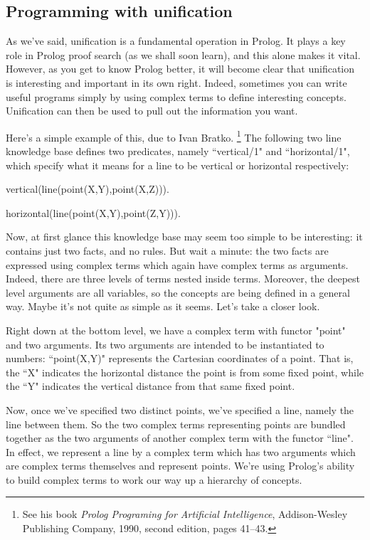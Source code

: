 \subsection*{Programming with unification}\label{SUBSEC.L2.PROGRAMMING-WITH-UNIFICATION}

As we've said, unification is a fundamental operation in Prolog.  It
plays a key role in Prolog proof search (as we shall soon learn), and
this alone makes it vital. However, as you get to know Prolog better,
it will become clear that unification is interesting and important in its
own right. Indeed, sometimes you can write useful programs simply by
using complex terms to define interesting concepts. Unification can then
be used to pull out the information you want.

Here's a simple example of this, due to Ivan Bratko.%
\footnote{See his book
\textit{Prolog Programing for Artificial Intelligence},
Addison-Wesley Publishing Company, 1990, second edition, pages
41--43.}
The following two line knowledge base defines two
predicates, namely ``vertical/1" and ``horizontal/1", which specify what
it means for a line to be vertical or horizontal respectively:
%
\begin{LPNcodedisplay}
vertical(line(point(X,Y),point(X,Z))).

horizontal(line(point(X,Y),point(Z,Y))).
\end{LPNcodedisplay}


Now, at first glance this knowledge base may seem too simple to be
interesting: it contains just two facts, and no rules.  But wait a
minute: the two facts are expressed using complex terms which again
have complex terms as arguments. Indeed, there are three levels of
terms nested inside terms. Moreover, the deepest level arguments are
all variables, so the concepts are being defined in a general way.
Maybe it's not quite as simple as it seems.  Let's take a closer look.

Right down at the bottom level, we have a complex term with functor
"point" and two arguments. Its two arguments are intended to be
instantiated to numbers: ``point(X,Y)" represents the Cartesian
coordinates of a point.  That is, the ``X" indicates the horizontal
distance the point is from some fixed point, while the ``Y" indicates
the vertical distance from that same fixed point.

Now, once we've specified two distinct points, we've specified a line,
namely the line between them.  So the two complex terms representing
points are bundled together as the two arguments of another complex
term with the functor ``line". In effect, we represent a line by a
complex term which has two arguments which are complex terms
themselves and represent points. We're using Prolog's ability to build
complex terms to work our way up a hierarchy of concepts.


